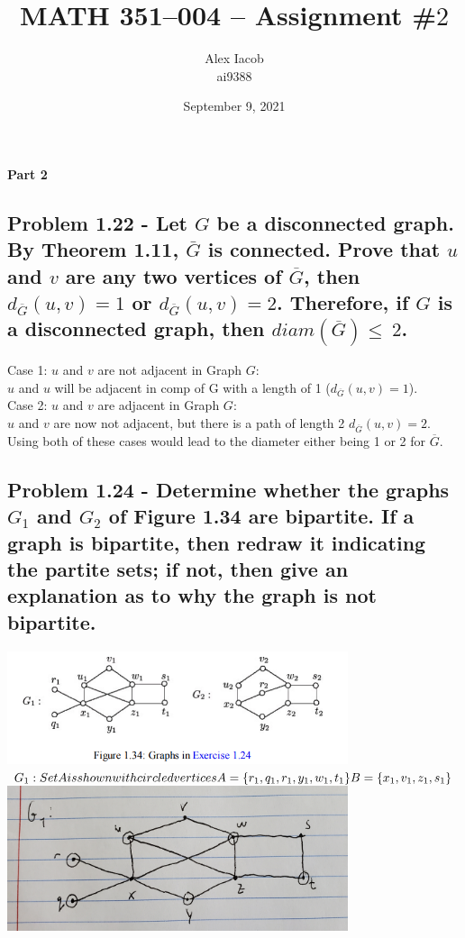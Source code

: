 \documentclass[10pt,a4paper]{article}
\title{MATH 351--004 -- Assignment \#$2$\\
}
\author{Alex Iacob\\
ai9388}
\date{September 9, 2021}
\begin{document}
\maketitle

\begin{center}
{\bf \large Part 2}
\end{center}

\subsection*{Problem 1.22 - Let $G$ be a disconnected graph. By Theorem 1.11, $\bar{G}$ is connected. Prove that $u$ and $v$ are any two vertices of $\overline{G}$, then $d_{\overline{G}} (u, v) = 1$ or  $d_{\overline{G}} (u, v) = 2$. Therefore, if $G$ is a disconnected graph, then $diam(\overline{G}) \leq\ 2$.
}

Case 1: $u$ and $v$ are not adjacent in Graph $G$: \\
	$u$ and $u$ will be adjacent in comp of G with a length of 1 ($d_{\overline{G}} (u, v) = 1$). \\	
Case 2: $u$ and $v$ are adjacent in Graph $G$: \\
	$u$ and $v$ are now not adjacent, but there is a path of length 2 $d_{\overline{G}} (u, v) = 2$. \\
	
Using both of these cases would lead to the diameter either being 1 or 2 for $\overline{G}$.
\subsection*{Problem 1.24 - Determine whether the graphs $G_{1}$ and $G_{2}$ of Figure 1.34 are bipartite. If a graph is bipartite, then redraw it indicating the partite sets; if not, then give an explanation as to why the graph is not bipartite.
}
\includegraphics[width=10cm]{fig134}\\

$G_{1}: Set A is shown with circled vertices\\ 
A = \{r_{1}, q_{1}, r_{1}, y_{1}, w_{1}, t_{1}\} \\ 
B = \{x_{1}, v_{1}, z_{1}, s_{1}\}$\\
\includegraphics[width=10cm]{answerg1}
\end{document}
